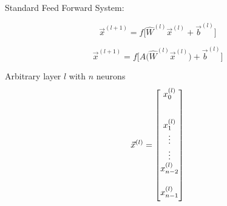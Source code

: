 \documentclass[12pt,letterpaper]{article}
\begin{document}
Standard Feed Forward System:

\vspace{3cm}

\begin{equation}
\label{Standard Feed Forward}
\vec{x}^{(l+1)} = f  \Big[ \hat{W}^{(l)}\vec{x}^{(l)} + \vec{b}^{(l)} \Big]
\end{equation}

\vspace{1cm}

\begin{equation}
\label{Attack Feed Forward}
\vec{x}^{(l+1)} = f  \Big[ A\big(\hat{W}^{(l)}\vec{x}^{(l)}\big) + \vec{b}^{(l)} \Big]
\end{equation}

\vspace{3cm}

Arbitrary layer $l$ with $n$ neurons
\begin{equation}
\label{layer l}
\vec{x}^{(l)} = 
\begin{bmatrix}
\vspace{0.3cm}
x^{(l)}_{0} \vspace{0.5cm} \\ 
x^{(l)}_{1} \\ 
\vdots \\ \vdots \\ 
x^{(l)}_{n-2} \vspace{0.5cm} \\ 
x^{(l)}_{n-1} \vspace{0.2cm}
\end{bmatrix}
\end{equation}
\end{document}

